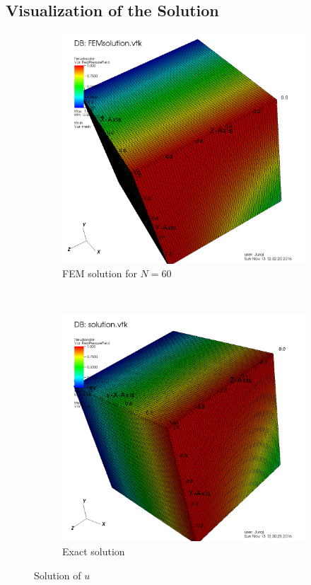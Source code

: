 \documentclass[unicode,11pt,a4paper,oneside,numbers=endperiod,openany]{scrartcl}
\begin{document}
\subsection{Visualization of the Solution}
\begin{figure}
    \centering
    \begin{subfigure}[b]{0.45\textwidth}
        \includegraphics[width=\textwidth]{../FEMsolution}
        \caption{FEM solution for $N=60$}
        \label{fig:gull}
    \end{subfigure}
    ~ %
    \begin{subfigure}[b]{0.45\textwidth}
        \includegraphics[width=\textwidth]{../solution}
        \caption{Exact solution}
        \label{fig:tiger}
    \end{subfigure}
    \caption{Solution of $u$}\label{fig:animals}
\end{figure}
\end{document}
